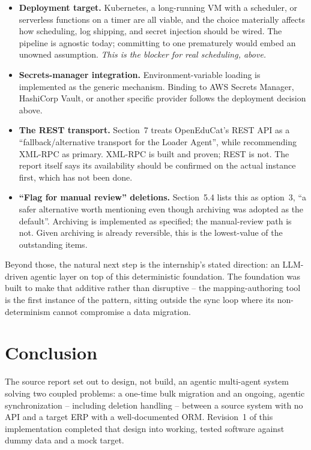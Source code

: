 \documentclass[11pt,a4paper]{article}
\begin{document}
\begin{itemize}[leftmargin=1.4em]
    \item \textbf{Deployment target.} Kubernetes, a long-running VM with a scheduler, or
          serverless functions on a timer are all viable, and the choice materially affects how
          scheduling, log shipping, and secret injection should be wired. The pipeline is
          agnostic today; committing to one prematurely would embed an unowned assumption.
          \emph{This is the blocker for real scheduling, above.}
    \item \textbf{Secrets-manager integration.} Environment-variable loading is implemented as the
          generic mechanism. Binding to AWS Secrets Manager, HashiCorp Vault, or another specific
          provider follows the deployment decision above.
    \item \textbf{The REST transport.} Section~7 treats OpenEduCat's REST API as a
          ``fallback/alternative transport for the Loader Agent'', while recommending XML-RPC as
          primary. XML-RPC is built and proven; REST is not. The report itself says its
          availability should be confirmed on the actual instance first, which has not been done.
    \item \textbf{``Flag for manual review'' deletions.} Section~5.4 lists this as option~3, ``a
          safer alternative worth mentioning even though archiving was adopted as the default''.
          Archiving is implemented as specified; the manual-review path is not. Given archiving
          is already reversible, this is the lowest-value of the outstanding items.
\end{itemize}

Beyond those, the natural next step is the internship's stated direction: an LLM-driven agentic
layer on top of this deterministic foundation. The foundation was built to make that additive
rather than disruptive -- the mapping-authoring tool is the first instance of the pattern, sitting
outside the sync loop where its non-determinism cannot compromise a data migration.

\section{Conclusion}

The source report set out to design, not build, an agentic multi-agent system solving two coupled
problems: a one-time bulk migration and an ongoing, agentic synchronization -- including deletion
handling -- between a source system with no API and a target ERP with a well-documented ORM.
Revision~1 of this implementation completed that design into working, tested software against
dummy data and a mock target.
\end{document}
